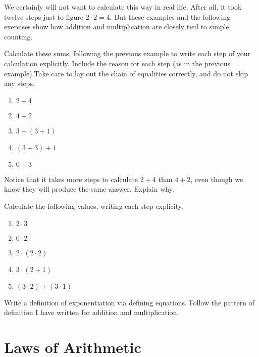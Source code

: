 We certainly will not want to calculate this way in real life. 
After all, it took twelve steps just to figure $2\cdot 2=4$. But these
examples and the following exercises show how addition and multiplication are
closely tied to simple counting. 

\ipadbreak

\begin{exer}
\begin{exercise}
\item Calculate these sums, following the previous example to write
  each step of your calculation explicitly. Include the reason for
  each step (as in the previous example).Take care to lay out the
  chain of equalities correctly, and do not skip any steps.
\begin{enumerate}
\item $2+4$
\item $4+2$
\item $3+(3+1)$
\item $(3+3)+1$
\item $0 + 3$
\end{enumerate}

\item Notice that it takes more steps to calculate $2+4$ than $4+2$, even though we know they will produce the same answer. Explain why.

\item Calculate the following values, writing each step explicity. 
 \begin{enumerate}
    \item $2\cdot 3$
    \item $0\cdot 2$
    \item $2\cdot(2\cdot 2)$
    \item $3\cdot(2 + 1)$
    \item $(3\cdot 2) + (3\cdot 1)$
    \end{enumerate}
\item Write a definition of exponentiation via defining equations. Follow the pattern
of definition I have written for addition and multiplication.
\end{exercise}
\end{exer}

\chapter{Laws of Arithmetic}\label{lec:ArithmeticLaws}


